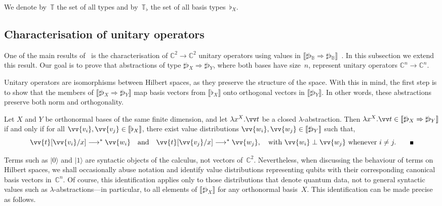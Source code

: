 \documentclass[runningheads,orivec,envcountsame,envcountsect]{llncs}
\providecommand{\qed}{\hbox{\rule{1ex}{1ex}}}%
\newcommand\ket[1]{\ensuremath{|#1\rangle}}
\newcommand\lra{\longrightarrow}
\def\C{\mathbb{C}}            %
\def\Lam#1#2#3{\lambda#1^{#2}{.}#3} %
\def\eval{\lra^*}
\def\Arr{\Rightarrow}
\def\Type{\mathbb{T}}
\def\BasisType{\Type_\flat}
\def\sem#1{\llbracket#1\rrbracket}
\newcommand\B{\mathbb B}
\newcommand\basis[1]{\ensuremath{\flat_{#1}}}
\begin{document}
We denote by~$\Type$ the set of all types and by~$\BasisType$ the set of all
basis types~$\basis{X}$.

\subsection{Characterisation of unitary operators}


One of the main results of~\cite{DiazcaroGuillermoMiquelValironLICS19}
is the characterisation of $\C^2\to\C^2$ unitary operators using values in
$\sem{\sharp\basis{\B}\Arr\sharp\basis{\B}}$~\cite[Theorem IV.12]{DiazcaroGuillermoMiquelValironLICS19}.
In this subsection we extend this result. Our goal is to prove that abstractions
of type $\sharp\basis{X}\Arr\sharp\basis{Y}$, where both bases have size~$n$,
represent unitary operators
$\C^n\to\C^n$.

Unitary operators are isomorphisms between Hilbert spaces, as they preserve the
structure of the space. With this in mind, the first step is to show that the
members of $\sem{\sharp\basis{X}\Arr\sharp\basis{Y}}$ map basis vectors from
$\sem{\basis{X}}$ onto orthogonal vectors in $\sem{\sharp\basis{Y}}$. In other
words, these abstractions preserve both norm and orthogonality.

\begin{lemma}\label{lem:BasesIso}
  Let $X$ and $Y$ be orthonormal bases of the same finite
  dimension, and let $\Lam{x}{{X}}{\vv t}$ be a closed $\lambda$-abstraction.
  Then $\Lam{x}{{X}}{\vv t}\in\sem{\sharp\basis{X}\Arr\sharp\basis{Y}}$
  if and only if 
  for all $\vv{v_i},\vv{v_j}\in\sem{\basis{X}}$,
  there exist value distributions
  $\vv{w_i},\vv{w_j}\in\sem{\sharp\basis{Y}}$ such that,
  \[
    \vv{t}[\vv{v_i}/x]\eval\vv{w_i}
    \quad\text{and}\quad
    \vv{t}[\vv{v_j}/x]\eval\vv{w_j},
    \quad\text{with } 
    \vv{w_i}\perp\vv{w_j}\text{ whenever }i\neq j.
    \tag*{\qed}
  \]
\end{lemma}

Terms such as $\ket{0}$ and $\ket{1}$ are syntactic objects of the
calculus, not vectors of~$\C^2$. Nevertheless, when discussing the behaviour of
terms on Hilbert spaces, we shall occasionally abuse notation and identify
value distributions representing qubits with their corresponding canonical
basis vectors in~$\C^n$. Of course, this identification applies only to those
distributions that denote quantum data, not to general syntactic values such as
$\lambda$-abstractions---in particular, to all elements of
$\sem{\sharp\basis{X}}$ for any orthonormal basis~$X$. This identification can
be made precise as follows.
\end{document}
